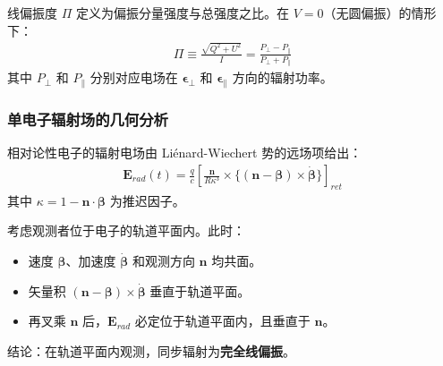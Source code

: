 \begin{definition}[偏振度]
线偏振度 $\Pi$ 定义为偏振分量强度与总强度之比。在 $V=0$（无圆偏振）的情形下：
\begin{align}
    \Pi \equiv \frac{\sqrt{Q^2 + U^2}}{I} = \frac{P_{\perp} - P_{\parallel}}{P_{\perp} + P_{\parallel}}
    \label{eq:pol_degree_def}
\end{align}
其中 $P_{\perp}$ 和 $P_{\parallel}$ 分别对应电场在 $\boldsymbol{\epsilon}_{\perp}$ 和 $\boldsymbol{\epsilon}_{\parallel}$ 方向的辐射功率。
\end{definition}


\subsubsection{单电子辐射场的几何分析}

相对论性电子的辐射电场由 Liénard-Wiechert 势的远场项给出：
\begin{align}
    \mathbf{E}_{rad}(t) = \frac{q}{c} \left[ \frac{\mathbf{n}}{R \kappa^3} \times \{(\mathbf{n} - \boldsymbol{\beta}) \times \dot{\boldsymbol{\beta}}\} \right]_{ret}
    \label{eq:E_rad_field}
\end{align}
其中 $\kappa = 1 - \mathbf{n} \cdot \boldsymbol{\beta}$ 为推迟因子。

\begin{derivationnote}[轨道平面内的偏振]
考虑观测者位于电子的轨道平面内。此时：
\begin{itemize}
    \item 速度 $\boldsymbol{\beta}$、加速度 $\dot{\boldsymbol{\beta}}$ 和观测方向 $\mathbf{n}$ 均共面。
    \item 矢量积 $(\mathbf{n} - \boldsymbol{\beta}) \times \dot{\boldsymbol{\beta}}$ 垂直于轨道平面。
    \item 再叉乘 $\mathbf{n}$ 后，$\mathbf{E}_{rad}$ 必定位于轨道平面内，且垂直于 $\mathbf{n}$。
\end{itemize}
结论：在轨道平面内观测，同步辐射为\textbf{完全线偏振}。
\end{derivationnote}

